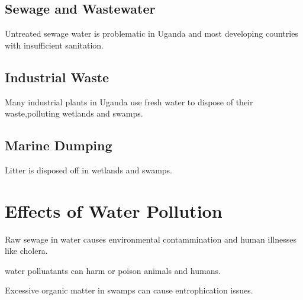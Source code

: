\documentclass{article}
\begin{document}
\subsection{Sewage and Wastewater}
Untreated sewage water is problematic in Uganda and most developing countries with insufficient sanitation.
\subsection{Industrial Waste}
Many industrial plants in Uganda use fresh water to dispose of their waste,polluting wetlands  and swamps.
\subsection{Marine Dumping}
Litter is disposed off in wetlands and swamps.
\section{Effects of Water Pollution}
Raw sewage in water causes environmental contammination and human illnesses like cholera.


water polluatants can harm or poison animals and humans.


Excessive organic matter in swamps can cause entrophication issues.\\
\end{document}
